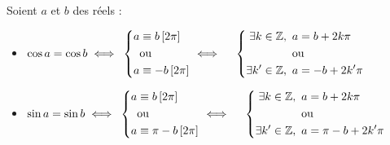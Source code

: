 \begin{rem}
	Soient \(a\) et \(b\) des réels :
	\begin{itemize}
		\item
		      \(
		      \begin{aligned}
			      \cos a = \cos b
			      \iff\
			       & \left\{
			      \begin{aligned}
				      a & \equiv b \croch{2\pi}  \\
				        & \text{ou}              \\
				      a & \equiv -b \croch{2\pi}
			      \end{aligned}
			      \right.
			      \iff\
			       & \left\{
			      \begin{aligned}
				      \quantifs{\exists k \in \Z}  & a = b +2 k \pi   \\
				                                   & \text{ou}        \\
				      \quantifs{\exists k' \in \Z} & a = -b +2 k' \pi
			      \end{aligned}
			      \right.
		      \end{aligned}
		      \)\\
		      \item\(
		      \begin{aligned}
			      \sin a = \sin b
			      \iff\
			       & \left\{
			      \begin{aligned}
				      a & \equiv b \croch{2\pi}     \\
				        & \text{ou}                 \\
				      a & \equiv \pi-b \croch{2\pi}
			      \end{aligned}
			      \right.
			      \iff\
			       & \left\{
			      \begin{aligned}
				      \quantifs{\exists k \in \Z}  & a = b +2 k \pi      \\
				                                   & \text{ou}           \\
				      \quantifs{\exists k' \in \Z} & a = \pi-b +2 k' \pi
			      \end{aligned}
			      \right.
		      \end{aligned}
		      \)
	\end{itemize}

\end{rem}

